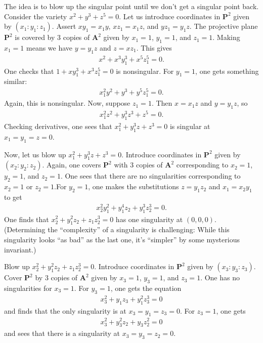 \documentclass[11pt, oneside,margin=1in]{article}
\begin{document}
\begin{example}\label{}\text{}
The idea is to blow up the singular point until we don't get a singular point back. Consider the variety $x^2+y^3+z^5=0$. Let us introduce coordinates in $\mathbf{P}^2$ given by $(x_1:y_1:z_1)$. Assert $xy_1=x_1y$, $xz_1=x_1z$, and $yz_1=y_1z$. The projective plane $\mathbf{P}^2$ is covered by $3$ copies of $\mathbf{A}^2$ given by $x_1=1$, $y_1=1$, and $z_1=1$. Making $x_1=1$ means we have $y=y_1z$ and $z=xz_1$. This gives 
\begin{align*}
	x^2+x^3y_1^3+x^5z_1^5=0.
\end{align*}
One checks that $1+xy_1^3 + x^3z_1^5=0$ is nonsingular. For $y_1=1$, one gets something similar:
\begin{align*}
	x_1^2y^2 + y^3 +y^5z_1^5=0.
\end{align*}
Again, this is nonsingular. Now, suppose $z_1=1$. Then $x=x_1z$ and $y=y_1z$, so
\begin{align*}
	x_1^2z^2 + y_1^3z^3 + z^5 =0.
\end{align*}
Checking derivatives, one sees that $x_1^2 + y_1^3z+z^3=0$ is singular at $x_1=y_1=z=0$.

Now, let us blow up $x_1^2+y_1^3z+z^3=0$. Introduce coordinates in $\mathbf{P}^2$ given by $(x_2:y_2:z_2)$. Again, one covers $\mathbf{P}^2$ with $3$ copies of $\mathbf{A}^2$ corresponding to $x_2=1$, $y_2=1$, and $z_2=1$. One sees that there are no singularities corresponding to $x_2=1$ or $z_2=1$.For $y_2=1$, one makes the substitutions $z=y_1z_2$ and $x_1=x_2y_1$ to get
\begin{align*}
	x_2^2y_1^2 + y_1^4z_2+y_1^3z_2^3=0.
\end{align*}
One finds that $x_2^2+y_1^2z_2+z_1z_2^3=0$ has one singularity at $(0,0,0)$. (Determining the ``complexity'' of a singularity is challenging: While this singularity looks ``as bad'' as the last one, it's ``simpler'' by some mysterious invariant.)

Blow up $x_2^2+y_1^2z_2+z_1z_2^3=0$. Introduce coordinates in $\mathbf{P}^2$ given by $(x_3:y_3:z_3)$. Cover $\mathbf{P}^2$ by $3$ copies of $\mathbf{A}^2$ given by $x_3=1$, $y_3=1$, and $z_3=1$. One has no singularities for $x_3=1$. For $y_3=1$, one gets the equation 
\begin{align*}
	x_3^2+y_1z_3+y_1^2z_3^3 =0
\end{align*}
and finds that the only singularity is at $x_3=y_1=z_3=0$. For $z_3=1$, one gets
\begin{align*}
	x_3^2+y_3^2z_2+y_3z_2^2 =0
\end{align*}
and sees that there is a singularity at $x_3=y_3=z_2=0$.


\end{example}
\end{document}
